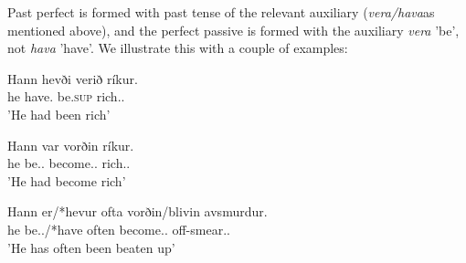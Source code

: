 \documentclass[12pt,%
]{lin-v2/lin}
\begin{document}
Past perfect is formed with past tense of the relevant auxiliary (\emph{vera/hava}as mentioned above), and the perfect
passive is formed with the auxiliary \emph{vera} 'be', not \emph{hava} 'have'. We illustrate this with a couple of examples:
\begin{exe}
    \ex
    \begin{xlist}
        \item \gll Hann hevði verið ríkur.\\
        he have.\Pst{} be.\textsc{sup} rich.\Nom.\M{}\\
        \trans 'He had been rich'
        \item \gll Hann var vorðin ríkur.\\
        he be.\Third\Sg.\Pst{} become.\Pst.\Ptcp{} rich.\Nom.\M{}\\
        \trans 'He had become rich'
    \end{xlist}
    \ex
    \gll Hann er/*hevur ofta vorðin/blivin avsmurdur.\\
    he be.\Third\Sg.\Prs{}/*have often become.\Pst.\Ptcp{} off-smear.\Nom.\M{}\\
    \trans 'He has often been beaten up'
\end{exe}
\end{document}
